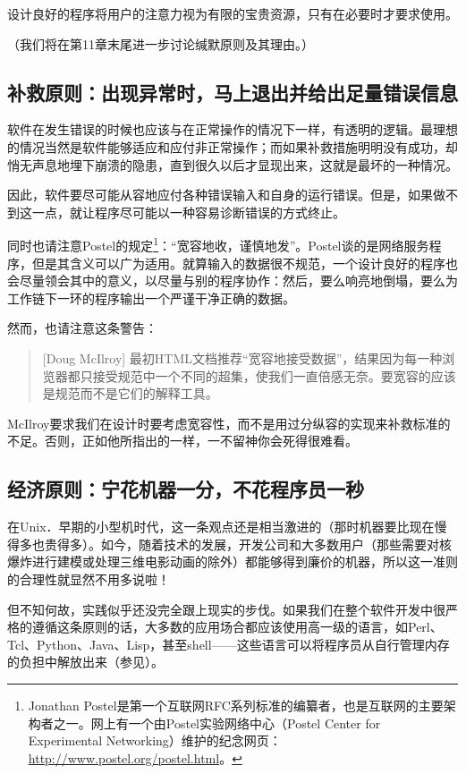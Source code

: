 \documentclass[12pt,oneside]{book}
\begin{document}
\begin{common-format}
设计良好的程序将用户的注意力视为有限的宝贵资源，只有在必要时才要求使用。

（我们将在第11章末尾进一步讨论缄默原则及其理由。）


\subsection{补救原则：出现异常时，马上退出并给出足量错误信息}
软件在发生错误的时候也应该与在正常操作的情况下一样，有透明的逻辑。最理想的情况当然是软件能够适应和应付非正常操作；而如果补救措施明明没有成功，却悄无声息地埋下崩溃的隐患，直到很久以后才显现出来，这就是最坏的一种情况。

因此，软件要尽可能从容地应付各种错误输入和自身的运行错误。但是，如果做不到这一点，就让程序尽可能以一种容易诊断错误的方式终止。

同时也请注意Postel的规定\footnote{Jonathan Postel是第一个互联网RFC系列标准的编纂者，也是互联网的主要架构者之一。网上有一个由Postel实验网络中心（Postel Center for Experimental Networking）维护的纪念网页：\href{http://www.postel.org/postel.html}{http://www.postel.org/postel.html}。}：“宽容地收，谨慎地发”。Postel谈的是网络服务程序，但是其含义可以广为适用。就算输入的数据很不规范，一个设计良好的程序也会尽量领会其中的意义，以尽量与别的程序协作：然后，要么响亮地倒塌，要么为工作链下一环的程序输出一个严谨干净正确的数据。

然而，也请注意这条警告：

\begin{quote}[Doug McIlroy]
最初HTML文档推荐“宽容地接受数据”，结果因为每一种浏览器都只接受规范中一个不同的超集，使我们一直倍感无奈。要宽容的应该是规范而不是它们的解释工具。
\end{quote}

McIlroy要求我们在设计时要考虑宽容性，而不是用过分纵容的实现来补救标准的不足。否则，正如他所指出的一样，一不留神你会死得很难看。

\subsection{经济原则：宁花机器一分，不花程序员一秒}
在Unix．早期的小型机时代，这一条观点还是相当激进的（那时机器要比现在慢得多也贵得多）。如今，随着技术的发展，开发公司和大多数用户（那些需要对核爆炸进行建模或处理三维电影动画的除外）都能够得到廉价的机器，所以这一准则的合理性就显然不用多说啦！

但不知何故，实践似乎还没完全跟上现实的步伐。如果我们在整个软件开发中很严格的遵循这条原则的话，大多数的应用场合都应该使用高一级的语言，如Perl、Tcl、Python、Java、Lisp，甚至shell——这些语言可以将程序员从自行管理内存的负担中解放出来（参见\cite{Ravenbrook}）。


\end{common-format}
\end{document}
